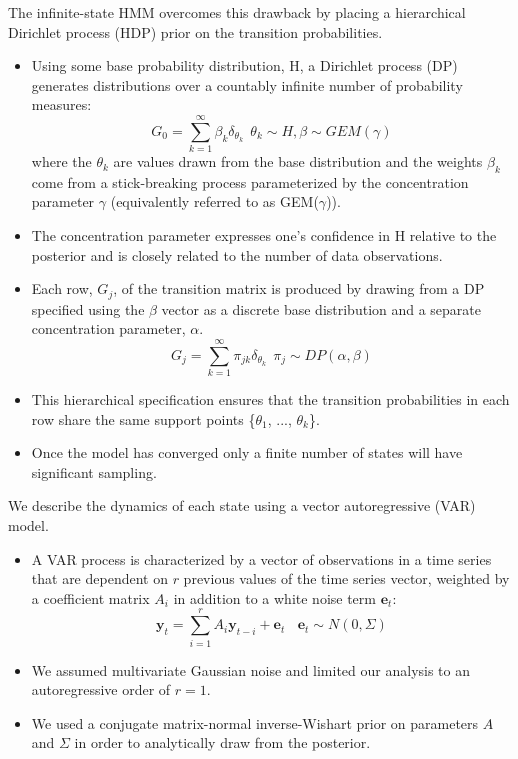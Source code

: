 \documentclass{article}
\begin{document}
  The infinite-state HMM overcomes this drawback by placing a hierarchical
  Dirichlet process (HDP) prior on the transition probabilities.
  \begin{itemize}
    \item Using some base probability distribution, H, a Dirichlet process 
    (DP) generates distributions over a countably infinite number of 
    probability measures:
    \begin{equation}
      G_0 = \sum_{k=1}^{\infty} \beta_k \delta_{\theta_k} ~~ \theta_k \sim H, \beta \sim GEM(\gamma)
    \end{equation}
    where the $\theta_k$ are values drawn from the base distribution and the
    weights $\beta_k$ come from a stick-breaking process parameterized by the concentration 
    parameter $\gamma$ (equivalently referred to as GEM($\gamma$)). 
    \item The concentration parameter expresses one's confidence in H relative to the posterior 
    and is closely related to the number of data observations.
    \item Each row, $G_j$, of the transition matrix is produced by drawing from a DP specified 
    using the $\beta$ vector as a discrete base distribution and a separate concentration
    parameter, $\alpha$.
    \begin{equation}
      G_j = \sum_{k=1}^{\infty} \pi_{jk} \delta_{\theta_k} ~~ \pi_j \sim DP(\alpha, \beta)
    \end{equation}
    \item This hierarchical specification ensures that the transition probabilities in 
    each row share the same support points \{$\theta_1$, ..., $\theta_k$\}.
    \item Once the model has converged only a finite number of states will have significant
    sampling.
  \end{itemize}
   
  \noindent We describe the dynamics of each state using a vector autoregressive (VAR) model. 
  \begin{itemize}
  	\item A VAR process is characterized by a vector of observations in a time series 
  	that are dependent on $r$ previous values of the time series vector, weighted by a
  	coefficient matrix $A_i$ in addition to a white noise term $\mathbf{e}_t$:
  	\begin{equation}
  	\mathbf{y}_t = \sum_{i=1}^r A_i\mathbf{y}_{t-i} + \mathbf{e}_t~~~~\mathbf{e}_t \sim N(0, \Sigma)
  	\end{equation}
  	\item We assumed multivariate Gaussian noise and limited our analysis to an 
  	autoregressive order of $r=1$.
  	\item We used a conjugate matrix-normal inverse-Wishart prior on parameters
  	$A$ and $\Sigma$ in order to analytically draw from the posterior.
  \end{itemize}   
  
\end{document}

